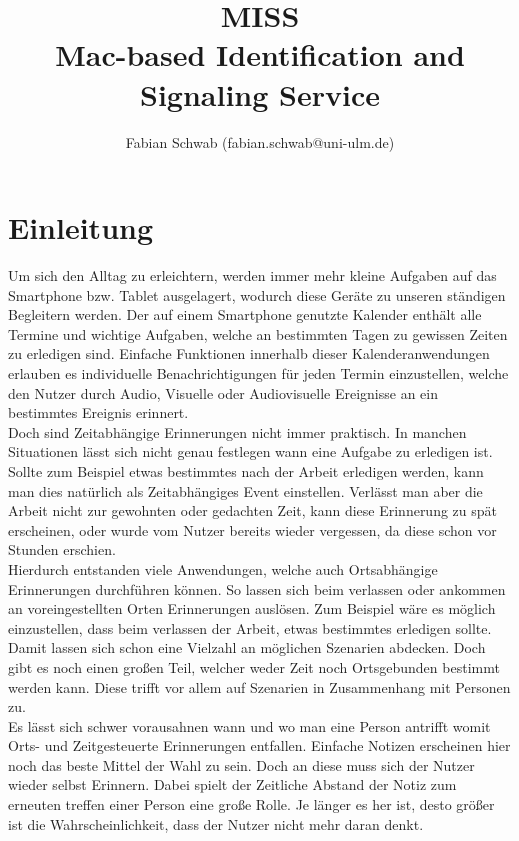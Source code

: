 \documentclass[]{report}
\title{MISS \\ Mac-based Identification and Signaling Service}
\author{Fabian Schwab (fabian.schwab@uni-ulm.de)}
\begin{document}
\maketitle

\chapter{Einleitung}
Um sich den Alltag zu erleichtern, werden immer mehr kleine Aufgaben auf das Smartphone bzw. Tablet ausgelagert, wodurch diese Geräte zu unseren ständigen Begleitern werden. Der auf einem Smartphone genutzte Kalender enthält alle Termine und wichtige Aufgaben, welche an bestimmten Tagen zu gewissen Zeiten zu erledigen sind. Einfache Funktionen innerhalb dieser Kalenderanwendungen erlauben es individuelle Benachrichtigungen für jeden Termin einzustellen, welche den Nutzer durch Audio, Visuelle oder Audiovisuelle Ereignisse an ein bestimmtes Ereignis erinnert.\\
Doch sind Zeitabhängige Erinnerungen nicht immer praktisch. In manchen Situationen lässt sich nicht genau festlegen wann eine Aufgabe zu erledigen ist.\\
Sollte zum Beispiel etwas bestimmtes nach der Arbeit erledigen werden, kann man dies natürlich als Zeitabhängiges Event einstellen. Verlässt man aber die Arbeit nicht zur gewohnten oder gedachten Zeit, kann diese Erinnerung zu spät erscheinen, oder wurde vom Nutzer bereits wieder vergessen, da diese schon vor Stunden erschien. \\
Hierdurch entstanden viele Anwendungen, welche auch Ortsabhängige Erinnerungen durchführen können. So lassen sich beim verlassen oder ankommen an voreingestellten Orten Erinnerungen auslösen. Zum Beispiel wäre es möglich einzustellen, dass beim verlassen der Arbeit, etwas bestimmtes erledigen sollte. \\
Damit lassen sich schon eine Vielzahl an möglichen Szenarien abdecken. Doch gibt es noch einen großen Teil, welcher weder Zeit noch Ortsgebunden bestimmt werden kann. Diese trifft vor allem auf Szenarien in Zusammenhang mit Personen zu. \\
Es lässt sich schwer vorausahnen wann und wo man eine Person antrifft womit Orts- und Zeitgesteuerte Erinnerungen entfallen. Einfache Notizen erscheinen hier noch das beste Mittel der Wahl zu sein. Doch an diese muss sich der Nutzer wieder selbst Erinnern. Dabei spielt der Zeitliche Abstand der Notiz zum erneuten treffen einer Person eine große Rolle. Je länger es her ist, desto größer ist die Wahrscheinlichkeit, dass der Nutzer nicht mehr daran denkt. \\
\end{document}
